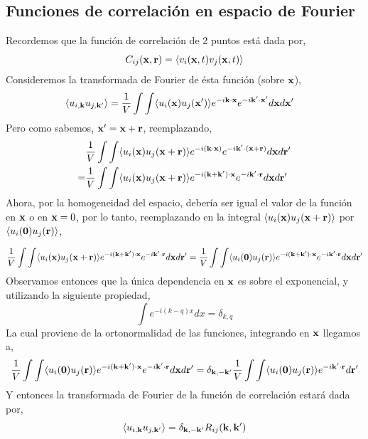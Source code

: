 \documentclass[executivepaper,12pt]{article}
\numberwithin{equation}{section}
\begin{document}
\subsection{Funciones de correlación en espacio de Fourier}

Recordemos que la función de correlación de 2 puntos está dada por,
\begin{equation*}
	C_{ij}(\vb{x},\vb{r})=\langle v_i(\vb{x},t)v_j(\vb{x},t) \rangle
\end{equation*}
Consideremos la transformada de Fourier de ésta función (sobre $\vb{x}$),
\begin{align*}
	\langle u_{i,\vb{k}}u_{j,\vb{k}'} \rangle &=\frac{1}{V}\int \int \langle u_i(\vb{x}) u_j(\vb{x}')\rangle e^{-i\vb{k}\cdot\vb{x}}e^{-i\vb{k}'\cdot\vb{x}'} d\vb{x}d\vb{x}'
\end{align*}
Pero como sabemos, $\vb{x}'=\vb{x}+\vb{r}$, reemplazando,
\begin{align*}
	&\frac{1}{V}\int \int \langle u_i(\vb{x}) u_j(\vb{x}+\vb{r})\rangle e^{-i(\vb{k}\cdot\vb{x})}e^{-i\vb{k}'\cdot(\vb{x}+\vb{r})} d\vb{x}d\vb{r}'\\
	=&\frac{1}{V}\int \int \langle u_i(\vb{x}) u_j(\vb{x}+\vb{r})\rangle e^{-i(\vb{k}+\vb{k}')\cdot\vb{x}}e^{-i\vb{k}'\cdot\vb{r}} d\vb{x}d\vb{r}'
\end{align*}
Ahora, por la homogeneidad del espacio, debería ser igual el valor de la función en $\vb{x}$ o en $\vb{x}=0$, por lo tanto, reemplazando en la integral $\langle u_i(\vb{x}) u_j(\vb{x}+\vb{r})\rangle$ por $\langle u_i(\vb{0}) u_j(\vb{r})\rangle$,

\begin{align*}
	\frac{1}{V}\int \int \langle u_i(\vb{x}) u_j(\vb{x}+\vb{r})\rangle e^{-i(\vb{k}+\vb{k}')\cdot\vb{x}}e^{-i\vb{k}'\cdot\vb{r}} d\vb{x}d\vb{r}'=\frac{1}{V}\int \int \langle u_i(\vb{0}) u_j(\vb{r})\rangle e^{-i(\vb{k}+\vb{k}')\cdot\vb{x}}e^{-i\vb{k}'\cdot\vb{r}} d\vb{x}d\vb{r}'
\end{align*}
Observamos entonces que la única dependencia en $\vb{x}$ es sobre el exponencial, y utilizando la siguiente propiedad,
\begin{equation*}
	\int e^{-i(k-q)x}dx=\delta_{k,q}
\end{equation*}
La cual proviene de la ortonormalidad de las funciones, integrando en $\vb{x}$ llegamos a,
\begin{equation*}
	\frac{1}{V}\int \int \langle u_i(\vb{0}) u_j(\vb{r})\rangle e^{-i(\vb{k}+\vb{k}')\cdot\vb{x}}e^{-i\vb{k}'\cdot\vb{r}} d\vb{x}d\vb{r}'=\delta_{\vb{k},-\vb{k'}}\frac{1}{V}\int \int \langle u_i(\vb{0}) u_j(\vb{r})\rangle e^{-i\vb{k}'\cdot\vb{r}}d\vb{r}'
\end{equation*} 
Y entonces la transformada de Fourier de la función de correlación estará dada por,
\begin{equation*}
	\langle u_{i,\vb{k}}u_{j,\vb{k}'} \rangle=\delta_{\vb{k},-\vb{k}'}R_{ij}(\vb{k},\vb{k}')
\end{equation*}
\end{document}
